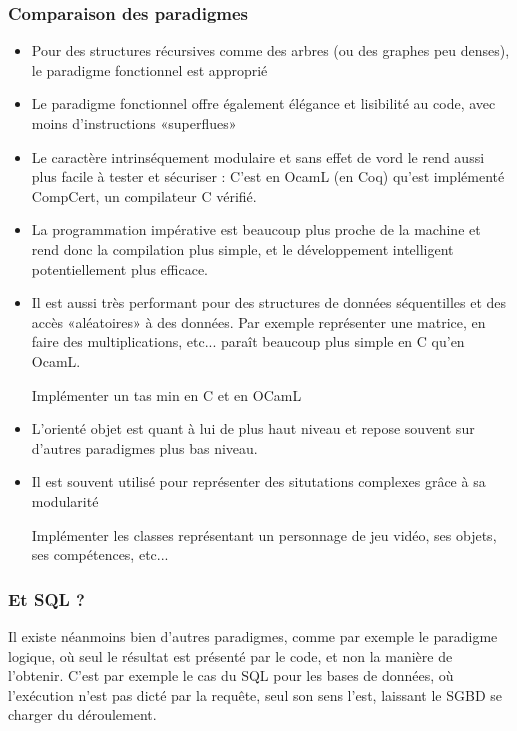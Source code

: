\subsubsection{Comparaison des paradigmes}
	\begin{itemize}[label=$\star$]
		\item Pour des structures récursives comme des arbres (ou des graphes peu denses), le paradigme fonctionnel est approprié
		\item Le paradigme fonctionnel offre également élégance et lisibilité au code, avec moins d'instructions «superflues»
		\item Le caractère intrinséquement modulaire et sans effet de vord le rend aussi plus facile à tester et sécuriser : C'est en OcamL (en Coq) qu'est implémenté CompCert, un compilateur C vérifié.
		\item La programmation impérative est beaucoup plus proche de la machine et rend donc la compilation plus simple, et le développement intelligent potentiellement plus efficace.
		\item Il est aussi très performant pour des structures de données séquentilles et des accès «aléatoires» à des données. Par exemple représenter une matrice, en faire des multiplications, etc... paraît beaucoup plus simple en C qu'en OcamL.
		\begin{exercise}
			Implémenter un tas min en C et en OCamL
		\end{exercise}
		\item L'orienté objet est quant à lui de plus haut niveau et repose souvent sur d'autres paradigmes plus bas niveau.
		\item Il est souvent utilisé pour représenter des situtations complexes grâce à sa modularité
		\begin{exercise}
			Implémenter les classes représentant un personnage de jeu vidéo, ses objets, ses compétences, etc...
		\end{exercise}
	\end{itemize}

\subsubsection{Et SQL ?}

	Il existe néanmoins bien d'autres paradigmes, comme par exemple le paradigme logique, où seul le résultat est présenté par le code, et non la manière de l'obtenir. C'est par exemple le cas du SQL pour les bases de données, où l'exécution n'est pas dicté par la requête, seul son sens l'est, laissant le SGBD se charger du déroulement.